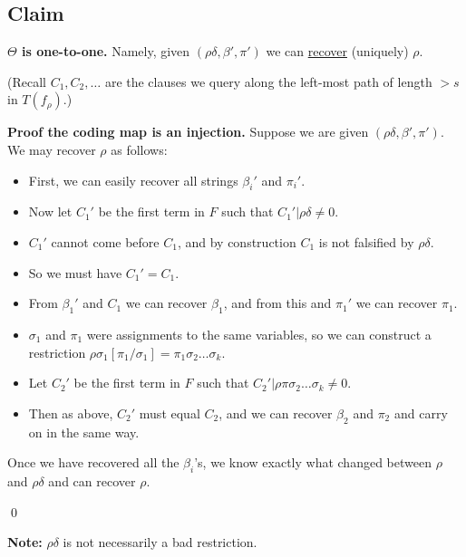 \subsection*{Claim}
\noindent
\textbf{\(\Theta\) is one-to-one.} Namely, given \( (\rho\delta, \beta', \pi') \) we can \underline{recover} (uniquely) \( \rho \).

\noindent
(Recall \( C_1, C_2, \dots \) are the clauses we query along the left-most path of length \( >s \) in \( T(f_{\rho}) \).)


\begin{tcolorbox}[colframe=white, colback=blue!4, boxrule=0mm, sharp corners]
\textbf{Proof the coding map is an injection.} Suppose we are given \( (\rho\delta, \beta', \pi') \). We may recover \( \rho \) as follows:

\begin{itemize}
    \item First, we can easily recover all strings \( \beta_i' \) and \( \pi_i' \).
    \item Now let \( C_1' \) be the first term in \( F \) such that \( C_1' | \rho\delta \neq 0 \).
    \item \( C_1' \) cannot come before \( C_1 \), and by construction \( C_1 \) is not falsified by \( \rho\delta \).
    \item So we must have \( C_1' = C_1 \).
    \item From \( \beta_1' \) and \( C_1 \) we can recover \( \beta_1 \), and from this and \( \pi_1' \) we can recover \( \pi_1 \).
    \item \( \sigma_1 \) and \( \pi_1 \) were assignments to the same variables, so we can construct a restriction \( \rho\sigma_1[\pi_1/\sigma_1] = \pi_1\sigma_2 \dots \sigma_k \).
    \item Let \( C_2' \) be the first term in \( F \) such that \( C_2' | \rho\pi\sigma_2 \dots \sigma_k \neq 0 \).
    \item Then as above, \( C_2' \) must equal \( C_2 \), and we can recover \( \beta_2 \) and \( \pi_2 \) and carry on in the same way.
\end{itemize}

\noindent
Once we have recovered all the \( \beta_i \)'s, we know exactly what changed between \( \rho \) and \( \rho\delta \) and can recover \( \rho \).

 \qed 
\end{tcolorbox}

\noindent
\textbf{Note:} \( \rho\delta \) is not necessarily a bad restriction.

